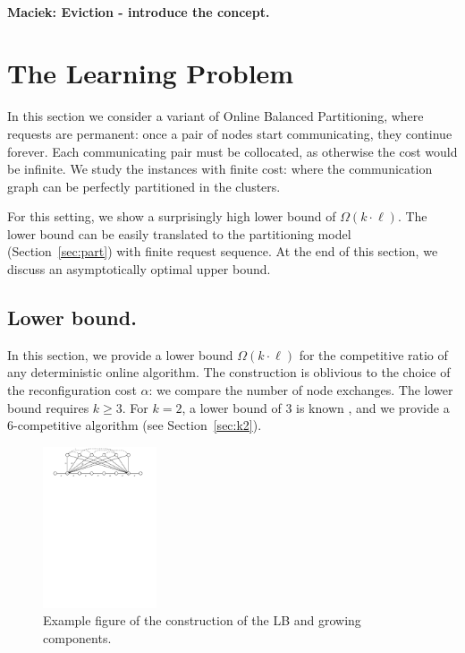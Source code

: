 \documentclass[manuscript,screen=true, review, anonymous]{acmart}
\newcommand\maciek[1]{\color{brown}\textbf{\\ Maciek: #1}\color{black}}
\begin{document}
\maciek{Eviction - introduce the concept.}


\section{The Learning Problem} %

In this section we consider a variant of Online Balanced Partitioning, where requests are permanent: once a pair of nodes start communicating, they continue forever.
Each communicating pair must be collocated, as otherwise the cost would be infinite.
We study the instances with finite cost: where the communication graph can be perfectly partitioned in the clusters.


For this setting, we show a surprisingly high lower bound of $\Omega(k \cdot \ell)$.
The lower bound can be easily translated to the partitioning model (Section~\ref{sec:part}) with finite request sequence.
At the end of this section, we discuss an asymptotically optimal upper bound.


\subsection{Lower bound.}

\label{sec:lowerbound}


In this section, we provide a lower bound $\Omega(k\cdot \ell)$ for the competitive ratio of any deterministic online algorithm.
The construction is oblivious to the choice of the reconfiguration cost $\alpha$: we compare the number of node exchanges.
The lower bound requires $k\geq 3$.
For $k=2$, a lower bound of $3$ is known \cite{repartition-disc}, and we provide a $6$-competitive algorithm (see Section~\ref{sec:k2}).




\begin{figure}[H]
	\centering
	\includegraphics[width=0.3\textwidth]{figs/substitute}
	\caption{Example figure of the construction of the LB and growing components.}
	\label{fig:nptree-construction}
\end{figure}
\end{document}
